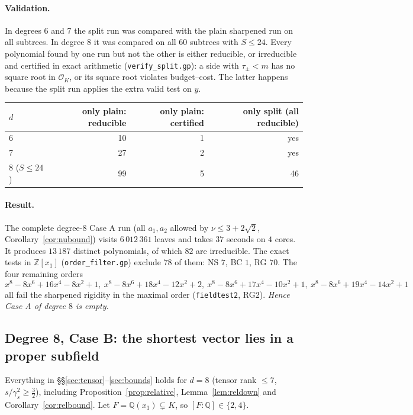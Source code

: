\documentclass[11pt]{amsart}
\theoremstyle{definition}
\newcommand{\OK}{\mathcal{O}_K}
\newcommand{\Q}{\mathbb{Q}}
\newcommand{\Z}{\mathbb{Z}}
\newcommand{\file}[1]{\texttt{#1}}
\begin{document}
\paragraph{Validation.}  In degrees $6$ and $7$ the split run was compared with the plain
sharpened run on all subtrees.  In degree $8$ it was compared on all $60$ subtrees with
$S\le24$.  Every polynomial found by one run but not the other is either reducible, or
irreducible and certified in exact arithmetic (\file{verify\_split.gp}): a side with
$\tau_\pm<m$ has no square root in $\OK$, or its square root violates budget--cost.  The
latter happens because the split run applies the extra valid test on $y$.
\begin{center}
\begin{tabular}{lrrr}
\toprule
$d$ & only plain: reducible & only plain: certified & only split (all reducible)\\
\midrule
6 & 10 & 1 & yes\\
7 & 27 & 2 & yes\\
8 ($S\le24$) & 99 & 5 & 46\\
\bottomrule
\end{tabular}
\end{center}

\paragraph{Result.}  The complete degree-$8$ Case A run (all $a_1,a_2$ allowed by
$\nu\le3+2\sqrt2$, Corollary~\ref{cor:nubound}) visits $6\,012\,361$ leaves and takes $37$ seconds on $4$ cores.  It produces
$13\,187$ distinct polynomials, of which $82$ are irreducible.  The exact tests in
$\Z[x_1]$ (\file{order\_filter.gp}) exclude $78$ of them: NS $7$,
BC $1$, RG $70$.  The four remaining orders
\[
x^8-8x^6+16x^4-8x^2+1,\ x^8-8x^6+18x^4-12x^2+2,\ x^8-8x^6+17x^4-10x^2+1,\ x^8-8x^6+19x^4-14x^2+1
\]
all fail the sharpened rigidity in the maximal order (\file{fieldtest2}, RG2).
\emph{Hence Case A of degree $8$ is empty.}

\subsection{Degree 8, Case B: the shortest vector lies in a proper subfield}\label{sec:d8B}
Everything in \S\S\ref{sec:tensor}--\ref{sec:bounds} holds for $d=8$ (tensor rank $\le7$,
$s/\gamma_s^2\ge\frac32$), including Proposition~\ref{prop:relative},
Lemma~\ref{lem:reldown} and Corollary~\ref{cor:relbound}.  Let $F=\Q(x_1)\subsetneq K$, so
$[F:\Q]\in\{2,4\}$.
\end{document}
